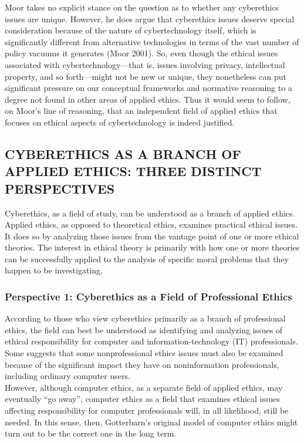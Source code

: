 \documentclass[12pt]{article}
\theoremstyle{definition}
\begin{document}
Moor takes no explicit stance on the question as to whether any cyberethics issues are
unique. However, he does argue that cyberethics issues deserve special consideration
because of the nature of cybertechnology itself, which is significantly different from
alternative technologies in terms of the vast number of policy vacuums it generates (Moor
2001). So, even though the ethical issues associated with cybertechnology—that is, issues
involving privacy, intellectual property, and so forth—might not be new or unique, they
nonetheless can put significant pressure on our conceptual frameworks and normative
reasoning to a degree not found in other areas of applied ethics. Thus it would seem to
follow, on Moor’s line of reasoning, that an independent field of applied ethics that
focuses on ethical aspects of cybertechnology is indeed justified.
\subsection{CYBERETHICS AS A BRANCH OF APPLIED ETHICS: THREE DISTINCT PERSPECTIVES}
Cyberethics, as a field of study, can be understood as a branch of applied ethics. Applied
ethics, as opposed to theoretical ethics, examines practical ethical issues. It does so by
analyzing those issues from the vantage point of one or more ethical theories. The interest in ethical theory is primarily with how one or more theories can be successfully applied to the analysis of specific moral problems that they happen to be investigating.\\
\subsubsection{Perspective 1: Cyberethics as a Field of Professional Ethics}
According to those who view cyberethics primarily as a branch of professional ethics, the
field can best be understood as identifying and analyzing issues of ethical responsibility for computer and information-technology (IT) professionals.\\
Some suggests that some nonprofessional ethics issues
must also be examined because of the significant impact they have on noninformation
professionals, including ordinary computer users.\\
However, although computer ethics, as a separate field of applied ethics, may eventually “go
away”, computer ethics as a field that examines ethical issues affecting responsibility for computer professionals will, in all likelihood, still be needed. In this sense, then, Gotterbarn’s original model of computer ethics might turn out to be the correct one in the long term.
\end{document}
